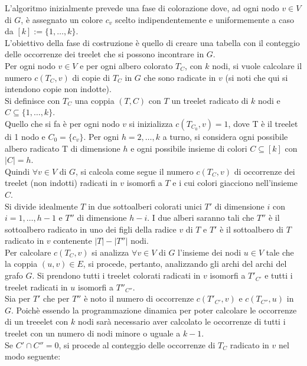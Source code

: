 L'algoritmo inizialmente prevede una fase di colorazione dove, ad ogni nodo $ v \in V $ di $ G $, \`e assegnato un colore $ c_v $ scelto indipendentemente e uniformemente a caso da $ [k] := \{1, \dots ,k\} $.\\
L'obiettivo della fase di costruzione \`e quello di creare una tabella con il conteggio delle occorrenze dei treelet che si possono incontrare in $ G $.\\
Per ogni nodo $ v \in V $ e per ogni albero colorato $ T_C $, con $ k $ nodi, si vuole calcolare il numero $ c(T_C , v) $ di copie di $ T_C $  in $ G $ che sono radicate in $ v $ (si noti che qui si intendono copie non indotte).\\
Si definisce con $ T_C $ una coppia $ (T,C) $ con $ T $ un treelet radicato di $ k $ nodi e $ C \subseteq {\{1,\dots,k\}} $.\\
Quello che si fa \`e per ogni nodo $ v $ si inizializza $ c(T_{C_0} , v) = 1 $, dove T \`e il treelet di 1 nodo e $ C_0 = \{c_v\} $.
Per ogni $ h = 2,\dots,k $ a turno, si considera ogni possibile albero radicato T di dimensione $ h $ e ogni possibile insieme di colori $ C \subseteq [k] $ con $ |C| = h $.\\
Quindi $ \forall v \in V$ di $ G $, si calcola come segue il numero $ c(T_C,v) $ di occorrenze dei treelet (non indotti) radicati in $ v $ isomorfi a $ T $ e i cui colori giacciono nell'insieme $ C $.
\\ Si divide idealmente $ T $ in due sottoalberi colorati unici $ T' $ di dimensione $ i $ con $ i = 1, \dots,h-1 $ e $ T'' $ di dimensione $ h-i $.
I due alberi saranno tali che  $ T'' $ \`e il sottoalbero radicato in uno dei figli della radice $ v $ di $ T $ e $ T' $ \`e il sottoalbero di $ T $ radicato in $ v $ contenente $ |T| - |T''| $ nodi.\\
Per calcolare $ c(T_C,v) $ si analizza $ \forall v \in V $ di $ G $ l'insieme dei nodi $ u \in V $ tale che la coppia $ (u,v)\in E $, si procede, pertanto, analizzando gli archi del archi del grafo $ G $.
Si prendono  tutti i treelet colorati radicati in $ v $ isomorfi a $ T'_{C'} $ e tutti i  treelet radicati in $ u $ isomorfi a $ T''_{C''} $.\\
Sia per $ T' $ che per $ T'' $ \`e noto il numero di occorrenze $ c(T'_{C'},v) $ e $ c(T_{C''},u) $ in $ G $. Poich\`e essendo la programmazione dinamica per poter calcolare le occorrenze di un treeelet con $ k $ nodi sar\`a necessario aver calcolato le occorrenze di tutti i treelet con un numero di nodi minore o uguale a $ k-1 $.\\
Se $ C' \cap C'' = 0 $, si procede al conteggio delle occorrenze di $ T_C $ radicato in $ v $ nel modo seguente:

